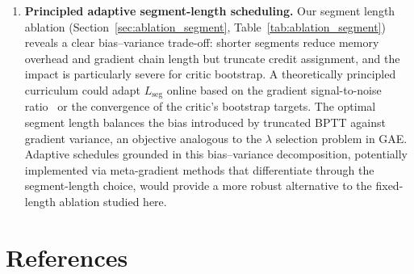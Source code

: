 \documentclass[11pt,a4paper]{article}
\begin{document}
\begin{enumerate}
  \item \textbf{Principled adaptive segment-length scheduling.}
  Our segment length ablation (Section~\ref{sec:ablation_segment}, Table~\ref{tab:ablation_segment}) reveals a clear bias--variance trade-off: shorter segments reduce memory overhead and gradient chain length but truncate credit assignment, and the impact is particularly severe for critic bootstrap. A theoretically principled curriculum could adapt $L_{\mathrm{seg}}$ online based on the gradient signal-to-noise ratio~\cite{pascanu2013exploding} or the convergence of the critic's bootstrap targets. The optimal segment length balances the bias introduced by truncated BPTT against gradient variance, an objective analogous to the $\lambda$ selection problem in GAE. Adaptive schedules grounded in this bias--variance decomposition, potentially implemented via meta-gradient methods that differentiate through the segment-length choice, would provide a more robust alternative to the fixed-length ablation studied here.

\end{enumerate}

\section*{References}
\label{sec:references}
\end{document}
